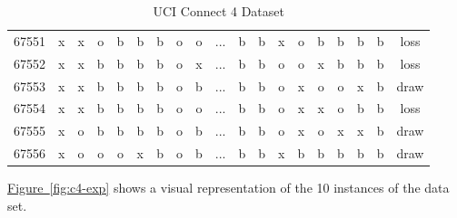 \documentclass{article}
\begin{document}
\begin{table}[h!]
\begin{tabular}{ | c | c c c c c c c c c c c c c c c c c | c | }
67551  &  x &  x &  o &  b &  b &  b &  o &  o & ... &  b &  b &  x &  o &  b &  b &  b &  b &    loss \\
67552  &  x &  x &  b &  b &  b &  b &  o &  x & ... &  b &  b &  o &  o &  x &  b &  b &  b &    loss \\
67553  &  x &  x &  b &  b &  b &  b &  o &  b & ... &  b &  b &  o &  x &  o &  o &  x &  b &    draw \\
67554  &  x &  x &  b &  b &  b &  b &  o &  o & ... &  b &  b &  o &  x &  x &  o &  b &  b &    loss \\
67555  &  x &  o &  b &  b &  b &  b &  o &  b & ... &  b &  b &  o &  x &  o &  x &  x &  b &    draw \\
67556  &  x &  o &  o &  o &  x &  b &  o &  b & ... &  b &  b &  x &  b &  b &  b &  b &  b &    draw \\
\hline

\end{tabular}
\caption{UCI Connect 4 Dataset}
\label{table:uci-dataset}
\end{table}

\hyperref[fig:c4-exp]{Figure~\ref*{fig:c4-exp}} shows a visual representation of the 10 instances of
the data set.

\end{document}
